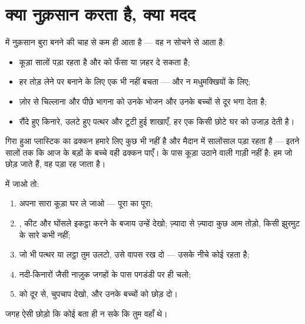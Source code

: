 \section{क्या नुक़सान करता है, क्या मदद}

\begin{proposition}\label{prop:g2:caring-for-nature:harm}
 में नुक़सान बुरा बनने की चाह से कम ही आता है --- वह न सोचने से
आता है:
\begin{itemize}
  \item कूड़ा सालों पड़ा रहता है और  को फँसा या ज़हर दे सकता है;
  \item हर  तोड़ लेने पर  बनाने के लिए एक भी नहीं बचता --- और न
        मधुमक्खियों के लिए;
  \item ज़ोर से चिल्लाना और पीछे भागना  को उनके भोजन और उनके
        बच्चों से दूर भगा देता है;
  \item रौंदे हुए किनारे, उलटे हुए पत्थर और टूटी हुई शाखाएँ, हर एक
        किसी छोटे घर को उजाड़ देती है।
\end{itemize}
\end{proposition}
\admitted

\begin{example}[बोतल का ढक्कन]\label{ex:g2:caring-for-nature:cap}
गिरा हुआ प्लास्टिक का ढक्कन हमारे लिए कुछ भी नहीं है और मैदान में
सालोंसाल पड़ा रहता है --- इतने सालों तक कि आज के बड़ों के बच्चे वही
ढक्कन पाएँ।  के पास कूड़ा उठाने वाली गाड़ी नहीं है: हम जो छोड़
जाते हैं, वह पड़ा रह जाता है।
\end{example}

\begin{method}[मेहमान के नियम]\label{met:g2:caring-for-nature:rules}
 में जाओ तो:
\begin{enumerate}
  \item अपना सारा कूड़ा घर ले जाओ --- पूरा का पूरा;
  \item {}, कीट और घोंसले इकट्ठा करने के बजाय उन्हें देखो; ज़्यादा
        से ज़्यादा कुछ आम  तोड़ो, किसी झुरमुट के सारे कभी नहीं;
  \item जो भी पत्थर या लट्ठा तुम उलटो, उसे वापस रख दो --- उसके नीचे
        कोई रहता है;
  \item नदी-किनारों जैसी नाज़ुक जगहों के पास पगडंडी पर ही चलो;
  \item {} को दूर से, चुपचाप देखो, और उनके बच्चों को छोड़ दो।
\end{enumerate}
जगह ऐसी छोड़ो कि कोई बता ही न सके कि तुम वहाँ थे।
\end{method}

